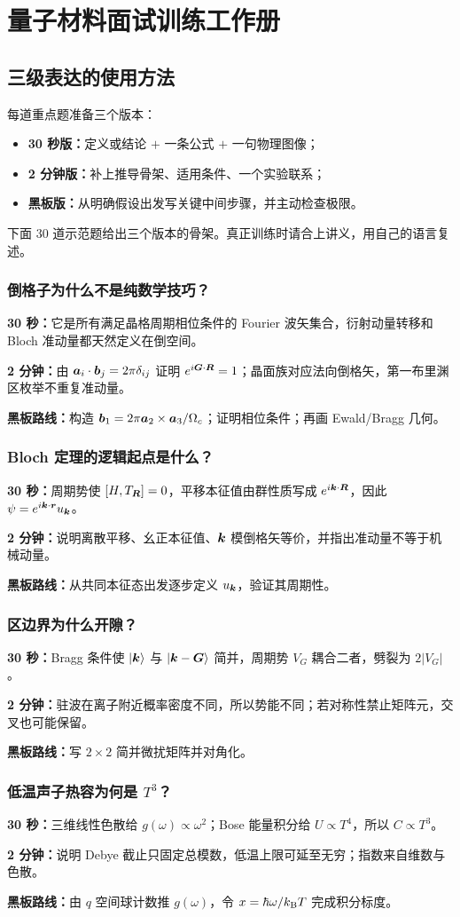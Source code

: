 \chapter{量子材料面试训练工作册}

\section{三级表达的使用方法}
每道重点题准备三个版本：
\begin{itemize}
\item \textbf{30 秒版：}定义或结论 $+$ 一条公式 $+$ 一句物理图像；
\item \textbf{2 分钟版：}补上推导骨架、适用条件、一个实验联系；
\item \textbf{黑板版：}从明确假设出发写关键中间步骤，并主动检查极限。
\end{itemize}
下面 30 道示范题给出三个版本的骨架。真正训练时请合上讲义，用自己的语言复述。

\newcommand{\trilevel}[4]{\subsection{#1}
\textbf{30 秒：}#2\par
\textbf{2 分钟：}#3\par
\textbf{黑板路线：}#4\par}

\trilevel{倒格子为什么不是纯数学技巧？}
{它是所有满足晶格周期相位条件的 Fourier 波矢集合，衍射动量转移和 Bloch 准动量都天然定义在倒空间。}
{由 $\bm{a}_i\cdot\bm{b}_j=2\pi\delta_{ij}$ 证明
$e^{i\bm{G}\cdot\bm{R}}=1$；晶面族对应法向倒格矢，第一布里渊区枚举不重复准动量。}
{构造 $\bm{b}_1=2\pi\bm{a}_2\times\bm{a}_3/\Omega_c$；证明相位条件；再画 Ewald/Bragg 几何。}

\trilevel{Bloch 定理的逻辑起点是什么？}
{周期势使 $[H,T_{\bm{R}}]=0$，平移本征值由群性质写成 $e^{i\bm{k}\cdot\bm{R}}$，因此 $\psi=e^{i\bm{k}\cdot\bm{r}}u_{\bm{k}}$。}
{说明离散平移、幺正本征值、$\bm{k}$ 模倒格矢等价，并指出准动量不等于机械动量。}
{从共同本征态出发逐步定义 $u_{\bm{k}}$，验证其周期性。}

\trilevel{区边界为什么开隙？}
{Bragg 条件使 $|\bm{k}\rangle$ 与 $|\bm{k}-\bm{G}\rangle$ 简并，周期势 $V_G$ 耦合二者，劈裂为 $2|V_G|$。}
{驻波在离子附近概率密度不同，所以势能不同；若对称性禁止矩阵元，交叉也可能保留。}
{写 $2\times2$ 简并微扰矩阵并对角化。}

\trilevel{低温声子热容为何是 $T^3$？}
{三维线性色散给 $g(\omega)\propto\omega^2$；Bose 能量积分给 $U\propto T^4$，所以 $C\propto T^3$。}
{说明 Debye 截止只固定总模数，低温上限可延至无穷；指数来自维数与色散。}
{由 $q$ 空间球计数推 $g(\omega)$，令 $x=\hbar\omega/k_{\mathrm B} T$ 完成积分标度。}

